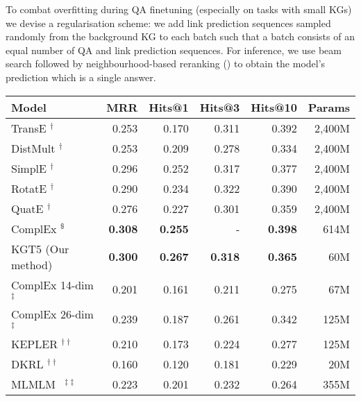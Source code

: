 \documentclass[11pt]{article}
\renewcommand\:{\colon} \newcommand{\sset}[1]{\left\{\,#1\,\right\}} \newcommand{\ssets}[1]{\left\{#1\right\}} \newcommand{\ssetn}[1]{\{\,#1\,\}}
\newcommand{\method}{\textsc{KGT5}}
\begin{document}
To combat overfitting during QA finetuning (especially on tasks with small KGs) we devise a regularisation scheme: we add link prediction sequences sampled randomly from the background KG to each batch such that a batch consists of an equal number of QA and link prediction sequences.
For inference, we use beam search followed by neighbourhood-based reranking () to obtain the model's prediction which is a single answer.










\begin{table*}[ht!]
\centering

\begin{tabular}{@{}lrrrrr@{}}
\toprule
\textbf{Model} & \textbf{MRR}   & \textbf{Hits@1} & \textbf{Hits@3} & \textbf{Hits@10} & \textbf{Params} \\ \midrule
TransE \cite{bordes2013translating} $^\dagger$        & 0.253          & 0.170            & 0.311           & 0.392            & 2,400M            \\
DistMult \cite{yang2015embedding} $^\dagger$      & 0.253          & 0.209           & 0.278           & 0.334            & 2,400M            \\
SimplE \cite{kazemi2018simple} $^\dagger$         & 0.296          & 0.252  & 0.317           & 0.377            & 2,400M            \\
RotatE \cite{sun2018rotate} $^\dagger$         & 0.290           & 0.234           & 0.322           & 0.390             & 2,400M            \\
QuatE \cite{zhang2019quaternion} $^\dagger$         & 0.276          & 0.227           & 0.301           & 0.359            & 2,400M            \\
ComplEx \cite{trouillon2016complex} $^\$$       & \textbf{0.308} & \textbf{0.255}           & -  & \textbf{0.398}   & 614M            \\ \midrule
\method{} (Our method)           & \textbf{0.300} & \textbf{0.267}   & \textbf{0.318}  & \textbf{0.365}   & 60M             \\
ComplEx 14-dim $^\ddagger$  & 0.201          & 0.161           & 0.211           & 0.275            & 67M             \\
ComplEx 26-dim $^\ddagger$  & 0.239          & 0.187           & 0.261           & 0.342            & 125M            \\
KEPLER \cite{wang2021KEPLER} $^{\dagger\dagger}$         & 0.210           & 0.173           & 0.224           & 0.277            & 125M            \\ 
DKRL \cite{Xie_Liu_Jia_Luan_Sun_2016} $^{\dagger\dagger}$         & 0.160           & 0.120           & 0.181           & 0.229            & 20M            \\ 
MLMLM~\cite{clouatre-etal-2021-mlmlm} $^{\ddagger\ddagger}$    &   0.223   &   0.201   &   0.232   &   0.264   &   355M   \\ \midrule


\end{tabular}
\end{table*}
\end{document}
